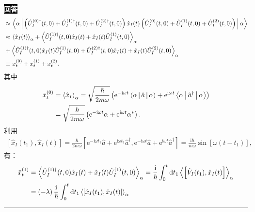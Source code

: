 \documentclass[11pt,a4paper]{ctexart}
\newenvironment{answer}
  {\par\smallskip\noindent
   \begingroup
   \setlength{\fboxsep}{4pt}%
   \colorbox{black}{\textcolor{white}{\bfseries 回答}}%
   \endgroup
   \quad\ignorespaces}
  {\par\smallskip\noindent\rule{\linewidth}{0.4pt}\medskip}
\begin{document}
\begin{answer}
\begin{equation}
\begin{aligned}
      &\approx \Braket{\alpha|\left(\hat{U}_I^{(0)\dag}(t,0)+\hat{U}_I^{(1)\dag}(t,0)+\hat{U}_I^{(2)\dag}(t,0) \right)\hat{x}_I(t) \left(\hat{U}_I^{(0)}(t,0)+\hat{U}_I^{(1)}(t,0)+\hat{U}_I^{(2)}(t,0) \right)|\alpha } \\
      &\approx \Braket{\hat{x}_I(t) }_\alpha + \Braket{\hat{U}_I^{(1)\dag}(t,0) \hat{x}_I(t) + \hat{x}_I(t)\hat{U}_I^{(1)}(t,0)  }_\alpha \\
      &+\Braket{\hat{U}_I^{(1)\dag}(t,0)\hat{x}_I(t)\hat{U}_I^{(1)}(t,0) + \hat{U}_I^{(2)\dag}(t,0) \hat{x}_I(t) + \hat{x}_I(t)\hat{U}_I^{(2)}(t,0)  }_\alpha \\
      &\equiv \bar{x}_t^{(0)} + \bar{x}_t^{(1)} + \bar{x}_t^{(2)}.
    \end{aligned}
  \end{equation}
  其中
  \begin{equation}
    \begin{aligned}
      \bar{x}_t^{(0)}
      &=\Braket{\hat{x}_I }_\alpha 
      =\sqrt{\frac{\hbar }{2m\omega } } \left(\mathrm{e}^{-\mathrm{i}\omega t}\Braket{\alpha|\hat{a}|\alpha } + \mathrm{e}^{\mathrm{i}\omega t}\Braket{\alpha|\hat{a}^\dag|\alpha } \right) \\
      &=\sqrt{\frac{\hbar }{2m\omega } } \left(\mathrm{e}^{-\mathrm{i}\omega t}\alpha + \mathrm{e}^{\mathrm{i}\omega t}\alpha^* \right).
    \end{aligned}
  \end{equation}
  利用
  \begin{equation}
    \begin{aligned}
      \left[\hat{x}_I(t_1),\hat{x}_I(t) \right]
      =\frac{\hbar }{2m\omega } \left[\mathrm{e}^{-\mathrm{i}\omega t_1}\hat{a} + \mathrm{e}^{\mathrm{i}\omega t_1}\hat{a}^\dag , \mathrm{e}^{-\mathrm{i}\omega t}\hat{a} + \mathrm{e}^{\mathrm{i}\omega t}\hat{a}^\dag \right]
      =\frac{\mathrm{i} \hbar}{m\omega } \sin\left[\omega\left(t-t_1 \right) \right],
    \end{aligned}
  \end{equation}
  有：
  \begin{equation}
    \begin{aligned}
      \bar{x}_t^{(1)}
      &=\Braket{\hat{U}_I^{(1)\dag}(t,0) \hat{x}_I(t) + \hat{x}_I(t)\hat{U}_I^{(1)}(t,0)  }_\alpha
      =\frac{\mathrm{i} }{\hbar } \int_{0}^{t} \mathrm{d}t_1 \Braket{\left[\hat{V}_I(t_1),\hat{x}_I(t) \right] }_\alpha \\
      &=\left(-\lambda \right)\frac{\mathrm{i} }{\hbar } \int_{0}^{t} \mathrm{d}t_1 \Braket{\left[\hat{x}_I(t_1),\hat{x}_I(t) \right] }_\alpha

\end{aligned}
\end{equation}
\end{answer}
\end{document}
